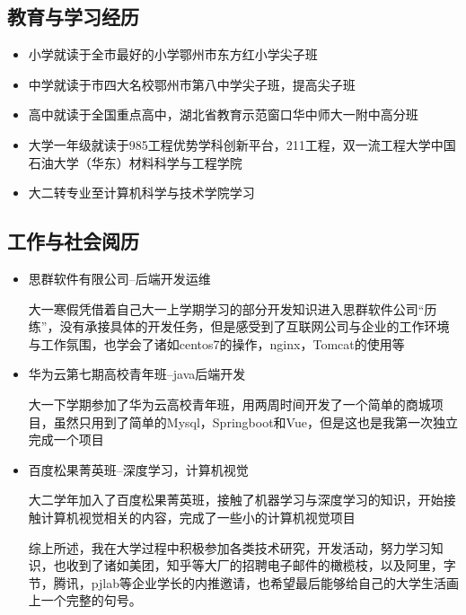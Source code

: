 \documentclass{article}
\begin{document}
\subsection{教育与学习经历}
\begin{itemize}
\item 小学就读于全市最好的小学鄂州市东方红小学尖子班
\item 中学就读于市四大名校鄂州市第八中学尖子班，提高尖子班
\item 高中就读于全国重点高中，湖北省教育示范窗口华中师大一附中高分班
\item 大学一年级就读于985工程优势学科创新平台，211工程，双一流工程大学中国石油大学（华东）材料科学与工程学院
\item 大二转专业至计算机科学与技术学院学习
\end{itemize}
\par
\subsection{工作与社会阅历}
\begin{itemize}
\item 思群软件有限公司--后端开发运维\par
大一寒假凭借着自己大一上学期学习的部分开发知识进入思群软件公司“历练”，没有承接具体的开发任务，但是感受到了互联网公司与企业的工作环境与工作氛围，也学会了诸如centos7的操作，nginx，Tomcat的使用等
\item 华为云第七期高校青年班--java后端开发\par
大一下学期参加了华为云高校青年班，用两周时间开发了一个简单的商城项目，虽然只用到了简单的Mysql，Springboot和Vue，但是这也是我第一次独立完成一个项目
\item 百度松果菁英班--深度学习，计算机视觉\par
大二学年加入了百度松果菁英班，接触了机器学习与深度学习的知识，开始接触计算机视觉相关的内容，完成了一些小的计算机视觉项目

综上所述，我在大学过程中积极参加各类技术研究，开发活动，努力学习知识，也收到了诸如美团，知乎等大厂的招聘电子邮件的橄榄枝，以及阿里，字节，腾讯，pjlab等企业学长的内推邀请，也希望最后能够给自己的大学生活画上一个完整的句号。

\end{itemize}

\par
\end{document}
